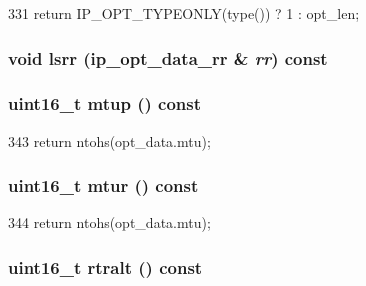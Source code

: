 \begin{DoxyCode}
331 { return IP_OPT_TYPEONLY(type()) ? 1 : opt_len; }
\end{DoxyCode}
\hypertarget{structNet_1_1IpOpt_a61ee22a35991ca04735272c593016b09}{
\subsubsection[{lsrr}]{\setlength{\rightskip}{0pt plus 5cm}void lsrr (ip\_\-opt\_\-data\_\-rr \& {\em rr}) const}}
\label{structNet_1_1IpOpt_a61ee22a35991ca04735272c593016b09}
\hypertarget{structNet_1_1IpOpt_a8575b82df43e40c41d2dc3e23563924a}{
\subsubsection[{mtup}]{\setlength{\rightskip}{0pt plus 5cm}uint16\_\-t mtup () const}}
\label{structNet_1_1IpOpt_a8575b82df43e40c41d2dc3e23563924a}



\begin{DoxyCode}
343 { return ntohs(opt_data.mtu); }
\end{DoxyCode}
\hypertarget{structNet_1_1IpOpt_afd89c74369442ef3d38570103bafb2b9}{
\subsubsection[{mtur}]{\setlength{\rightskip}{0pt plus 5cm}uint16\_\-t mtur () const}}
\label{structNet_1_1IpOpt_afd89c74369442ef3d38570103bafb2b9}



\begin{DoxyCode}
344 { return ntohs(opt_data.mtu); }
\end{DoxyCode}
\hypertarget{structNet_1_1IpOpt_a00f74d6764a9468eb1192d5434140717}{
\subsubsection[{rtralt}]{\setlength{\rightskip}{0pt plus 5cm}uint16\_\-t rtralt () const}}
\label{structNet_1_1IpOpt_a00f74d6764a9468eb1192d5434140717}



